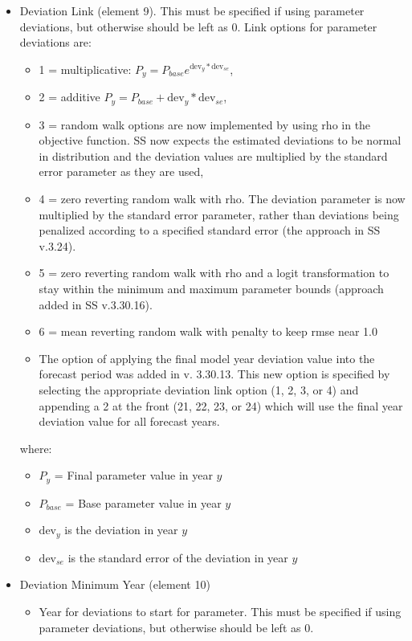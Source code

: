 {\begin{itemize}
\item Deviation Link (element 9). This must be specified if using parameter deviations, but otherwise should be left as 0. Link options for parameter deviations are:
	\begin{itemize}
		\item 1 = multiplicative: $P_y = P_{base}e^{\text{dev}_y*\text{dev}_{se}}$,
		\item 2 = additive $P_y = P_{base} + \text{dev}_y*\text{dev}_{se}$,
		\item 3 = random walk options are now implemented by using rho in the objective function. SS now expects the estimated deviations to be normal in distribution and the deviation values are multiplied by the standard error parameter as they are used,
		\item 4 = zero reverting random walk with rho. The deviation parameter is now multiplied by the standard error parameter, rather than deviations being penalized according to a specified standard error (the approach in SS v.3.24).
		\item 5 = zero reverting random walk with rho and a logit transformation to stay within the minimum and maximum parameter bounds (approach added in SS v.3.30.16).
		\item 6 = mean reverting random walk with penalty to keep rmse near 1.0
		\item The option of applying the final model year deviation value into the forecast period was added in v. 3.30.13.  This new option is specified by selecting the appropriate deviation link option (1, 2, 3, or 4) and appending a 2 at the front (21, 22, 23, or 24) which will use the final year deviation value for all forecast years. 
	\end{itemize}
	where: 
	\begin{itemize}
	     \item $P_{y}$ = Final parameter value in year $y$
         \item $P_{base}$ = Base parameter value in year $y$
		 \item $\text{dev}_y$ is the deviation in year $y$
		 \item $\text{dev}_{se}$ is the standard error of the deviation in year $y$
	\end{itemize}
\item Deviation Minimum Year (element 10)
	\begin{itemize}
		\item Year for deviations to start for parameter. This must be specified if using parameter deviations, but otherwise should be left as 0.
	\end{itemize}
	

\end{itemize}}
